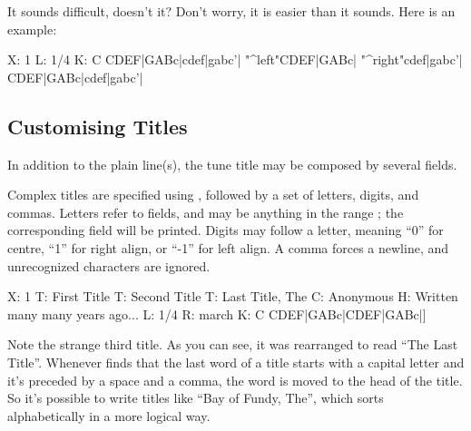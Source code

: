 \documentclass[a4paper,12pt]{book}
\begin{document}
It sounds difficult, doesn't it? Don't worry, it is easier than it
sounds. Here is an example:

\begin{abcsource}
X: 1
L: 1/4
K: C
CDEF|GABc|cdef|gabc'|
"^left"CDEF|GABc|
"^right"cdef|gabc'|
CDEF|GABc|cdef|gabc'|
\end{abcsource}



\subsection{Customising Titles}
\label{sec:titles}

In addition to the plain  line(s), the tune title may be
composed by several fields.

Complex titles are specified using , followed by
a set of letters, digits, and commas. Letters refer to \ABC{} fields,
and may be anything in the range ; the
corresponding field will be printed. Digits may follow a letter,
meaning ``0'' for centre, ``1'' for right align, or ``-1'' for left
align. A comma \car{,} forces a newline, and unrecognized characters
are ignored.

\begin{abcsource}
X: 1
T: First Title
T: Second Title
T: Last Title, The
C: Anonymous
H: Written many many years ago...
L: 1/4
R: march
K: C
CDEF|GABc|CDEF|GABc|]
\end{abcsource}


Note the strange third title. As you can see, it was rearranged to
read ``The Last Title''. Whenever \abcm{} finds that the last word of
a title starts with a capital letter and it's preceded by a space and
a comma, the word is moved to the head of the title. So it's possible
to write titles like ``Bay of Fundy, The'', which sorts alphabetically
in a more logical way.
\end{document}
